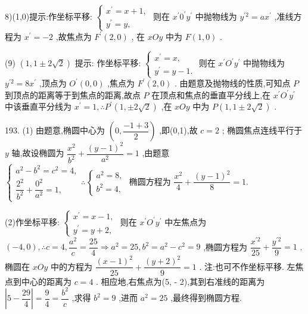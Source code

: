 8)(1,0)提示:作坐标平移: $\left\{  \begin{array}{l} {x}^{\prime } = x + 1, \\  {y}^{\prime } = y, \end{array}\right.$ 则在 ${x}^{\prime }{0}^{\prime }{y}^{\prime }$ 中抛物线为 ${y}^{\prime 2} = a{x}^{\prime }$ ,准线方程为 ${x}^{\prime } =  - 2$ ,故焦点为 ${F}^{\prime }\left( {2,0}\right)$ , 在 ${xOy}$ 中为 $F\left( {1,0}\right)$ .

(9) $\left( {1,1 \pm  2\sqrt{2}}\right)$ 提示: 作坐标平移: $\left\{  \begin{array}{l} {x}^{\prime } = x, \\  {y}^{\prime } = y - 1. \end{array}\right.$ 则在 ${x}^{\prime }{O}^{\prime }{y}^{\prime }$ 中抛物线为 ${y}^{\prime 2} = 8{x}^{\prime }$ ,顶点为 ${O}^{\prime }\left( {0,0}\right)$ ,焦点为 ${F}^{\prime }\left( {2,0}\right)$ . 由题意及抛物线的性质,可知点 $P$ 到顶点的距离等于到焦点的距离,故点 $P$ 在顶点和焦点的垂直平分线上,在 ${x}^{\prime }{O}^{\prime }{y}^{\prime }$ 中该垂直平分线为 ${x}^{\prime } = 1,\therefore {P}^{\prime }\left( {1, \pm  2\sqrt{2}}\right)$ ,在 ${xOy}$ 中为 $P\left( {1,1 \pm  2\sqrt{2}}\right)$ .

193. (1) 由题意,椭圆中心为 $\left( {0,\dfrac{-1 + 3}{2}}\right)$ ,即(0,1),故 $c = 2$ ; 椭圆焦点连线平行于 $y$ 轴,故设椭圆为 $\dfrac{{x}^{2}}{{b}^{2}} + \dfrac{{\left( y - 1\right) }^{2}}{{a}^{2}} = 1$ ,由题意 $\left\{  {\begin{array}{l} {a}^{2} - {b}^{2} = {c}^{2} = 4, \\  \dfrac{{2}^{2}}{{b}^{2}} + \dfrac{{0}^{2}}{{a}^{2}} = 1, \end{array}\therefore \left\{  {\begin{array}{l} {a}^{2} = 8, \\  {b}^{2} = 4, \end{array}\text{ 椭圆方程为 }\dfrac{{x}^{2}}{4} + \dfrac{{\left( y - 1\right) }^{2}}{8} = 1.}\right. }\right.$

(2)作坐标平移: $\left\{  \begin{array}{l} {x}^{\prime } = x - 1, \\  {y}^{\prime } = y + 2, \end{array}\right.$ 则在 ${x}^{\prime }{O}^{\prime }{y}^{\prime }$ 中左焦点为 $\left( {-4,0}\right) ,\therefore c = 4,\dfrac{{a}^{2}}{c} = \dfrac{25}{4} \Rightarrow  {a}^{2} = {25},{b}^{2} = {a}^{2} - {c}^{2} = 9$ ,椭圆方程为 $\dfrac{{x}^{\prime 2}}{25} + \dfrac{{y}^{\prime 2}}{9} = 1$ . 椭圆在 ${xOy}$ 中的方程为 $\dfrac{{\left( x - 1\right) }^{2}}{25} + \dfrac{{\left( y + 2\right) }^{2}}{9} = 1$ . 注:也可不作坐标平移. 左焦点到中心的距离为 $c = 4$ . 相应地,右焦点为(5, - 2),其到右准线的距离为 $\left| {5 - \dfrac{29}{4}}\right|  = \dfrac{9}{4} = \dfrac{{b}^{2}}{c}$ ,求得 ${b}^{2} = 9$ ,进而 ${a}^{2} = {25}$ ,最终得到椭圆方程.

